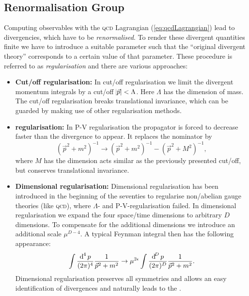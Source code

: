 \documentclass[../../index.tex]{subfiles}
\begin{document}
\subsection{Renormalisation Group}
Computing observables with the \textsc{qcd} Lagrangian (\cref{eq:qcdLagrangian})
lead to divergencies, which have to be \textit{renormalised}. To render these
divergent quantities finite we have to introduce a suitable parameter such that
the ``original divergent theory'' corresponds to a certain value of that
parameter. These procedure is referred to as \textit{regularisation} and there
are various approaches:
\begin{itemize}
\item \label{itm:lambdaRegularisation}\textbf{Cut\-/off regularisation:} In
  cut\-/off regularisation we limit the divergent momentum integrals by a
  cut\-/off \(\abs{\vec p} < \Lambda\). Here \(\Lambda\) has the dimension of
  mass. The cut\-/off regularisation breaks translational invariance, which can
  be guarded by making use of other regularisation methods.
\item \textbf{ regularisation:} \cite{Pauli1949}
  In \textsc{P-V} regularisation the propagator is forced to decrease faster
  than the divergence to appear. It replaces the nominator by
  \begin{equation}
    (\vec p^2 + m^2)^{-1} \to (\vec p^2 + m^2)^{-1} - (\vec p^2 + M^2)^{-1},
  \end{equation}
  where \(M\) has the dimension acts similar as the previously presented
  cut\-/off, but conserves translational invariance.
\item \textbf{Dimensional regularisation:}
  \cite{Bollini1972,tHooft1972,tHooft1973} Dimensional regularisation has been
  introduced in the beginning of the seventies to regularise non\-/abelian gauge
  theories (like \textsc{qcd}), where \(\Lambda\)- and
  \textsc{P-V}-regularisation failed. In dimensional regularisation we expand
  the four space\-/time dimensions to arbitrary \(D\) dimensions. To compensate
  for the additional dimensions we introduce an additional scale \(\mu^{D-4}\).
  A typical Feynman integral then has the following appearance:
  \begin{equation}
    \label{eq:dimRegFeynmanIntegral}
    \int \fdif{p} \frac{1}{\vec p^2 + m^2} \to \mu^{2\epsilon} \int \frac{\dif^D p}{(2\pi)^D}\frac{1}{\vec p^2+m^2}.
  \end{equation}
  Dimensional regularisation preserves all symmetries and allows an easy
  identification of divergences and naturally leads to the  \cite{tHooft1973,Weinberg1973a}.
\end{itemize}
\end{document}
